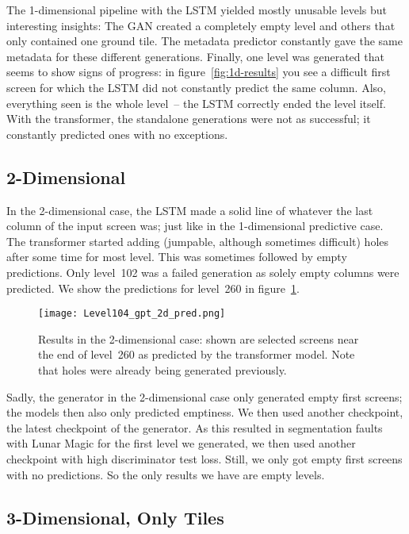 The 1-dimensional pipeline with the LSTM yielded mostly unusable
levels but interesting insights: The GAN created a completely empty
level and others that only contained one ground tile. The metadata
predictor constantly gave the same metadata for these different
generations. Finally, one level was generated that seems to show signs
of progress: in figure~\ref{fig:1d-results} you see a difficult first
screen for which the LSTM did not constantly predict the same column.
Also, everything seen is the whole level~-- the LSTM correctly ended
the level itself. \\
With the transformer, the standalone generations were not as
successful; it constantly predicted ones with no exceptions.

\subsection{2-Dimensional}

In the 2-dimensional case, the LSTM made a solid line of whatever the
last column of the input screen was; just like in the 1-dimensional
predictive case. \\
The transformer started adding (jumpable, although sometimes
difficult) holes after some time for most level. This was sometimes
followed by empty predictions. Only level~102 was a failed generation
as solely empty columns were predicted. We show the predictions for
level~260 in figure~\ref{fig:2d-results}.
\medskip

\begin{figure}[t]
  \centering
  \texttt{[image: Level104\_gpt\_2d\_pred.png]}
  \caption{Results in the 2-dimensional case: shown are selected
    screens near the end of level~260 as predicted by the transformer
    model. Note that holes were already being generated previously.}
  \label{fig:2d-results}
\end{figure}

Sadly, the generator in the 2-dimensional case only generated empty
first screens; the models then also only predicted emptiness. We then
used another checkpoint, the latest checkpoint of the generator. As
this resulted in segmentation faults with Lunar Magic for the first
level we generated, we then used another checkpoint with high
discriminator test loss. Still, we only got empty first screens with
no predictions. So the only results we have are empty levels.

\subsection{3-Dimensional, Only Tiles}


